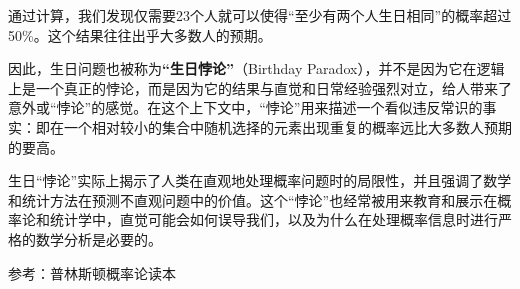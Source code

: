 通过计算，我们发现仅需要23个人就可以使得“至少有两个人生日相同”的概率超过50\%。这个结果往往出乎大多数人的预期。

因此，生日问题也被称为\textbf{“生日悖论”}（Birthday Paradox），并不是因为它在逻辑上是一个真正的悖论，而是因为它的结果与直觉和日常经验强烈对立，给人带来了意外或“悖论”的感觉。在这个上下文中，“悖论”用来描述一个看似违反常识的事实：即在一个相对较小的集合中随机选择的元素出现重复的概率远比大多数人预期的要高。

生日“悖论”实际上揭示了人类在直观地处理概率问题时的局限性，并且强调了数学和统计方法在预测不直观问题中的价值。这个“悖论”也经常被用来教育和展示在概率论和统计学中，直觉可能会如何误导我们，以及为什么在处理概率信息时进行严格的数学分析是必要的。

参考：普林斯顿概率论读本